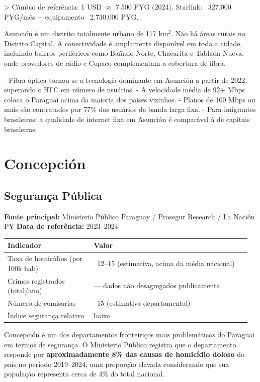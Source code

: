 > Câmbio de referência: 1 USD $\approx$ 7.500 PYG (2024). Starlink: ~327.000 PYG/mês + equipamento ~2.730.000 PYG.


Asunción é um distrito totalmente urbano de 117 km$^2$. Não há áreas rurais no Distrito Capital. A conectividade é amplamente disponível em toda a cidade, incluindo bairros periféricos como Bañado Norte, Chacarita e Tablada Nueva, onde provedores de rádio e Copaco complementam a cobertura de fibra.


- Fibra óptica tornou-se a tecnologia dominante em Asunción a partir de 2022, superando o HFC em número de usuários.
- A velocidade média de 92+ Mbps coloca o Paraguai acima da maioria dos países vizinhos.
- Planos de 100 Mbps ou mais são contratados por 77\% dos usuários de banda larga fixa.
- Para imigrantes brasileiros: a qualidade de internet fixa em Asunción é comparável à de capitais brasileiras.





\clearpage
\section{Concepción}
\label{sec:dept_01_Concepcion}

\subsection{Segurança Pública}

\textbf{Fonte principal:} Ministerio Público Paraguay / Prosegur Research / La Nación PY
\textbf{Data de referência:} 2023--2024


{\small
\setlength{\tabcolsep}{3pt}
\renewcommand{\arraystretch}{1.12}
\begin{tabularx}{\linewidth}{>{\raggedright\arraybackslash}p{0.34\linewidth} >{\raggedright\arraybackslash}p{0.62\linewidth}}
\toprule
Indicador & Valor \\
\midrule
Taxa de homicídios (por 100k hab) & ~12--15 (estimativa, acima da média nacional) \\
Crimes registrados (total/ano) & --- dados não desagregados publicamente \\
Número de comisarías & ~15 (estimativa departamental) \\
Índice segurança relativo & baixo \\
\bottomrule
\end{tabularx}
}


Concepción é um dos departamentos fronteiriços mais problemáticos do Paraguai em termos de segurança. O Ministerio Público registra que o departamento responde por \textbf{aproximadamente 8\% das causas de homicídio doloso} do país no período 2019--2024, uma proporção elevada considerando que sua população representa cerca de 4\% do total nacional.

